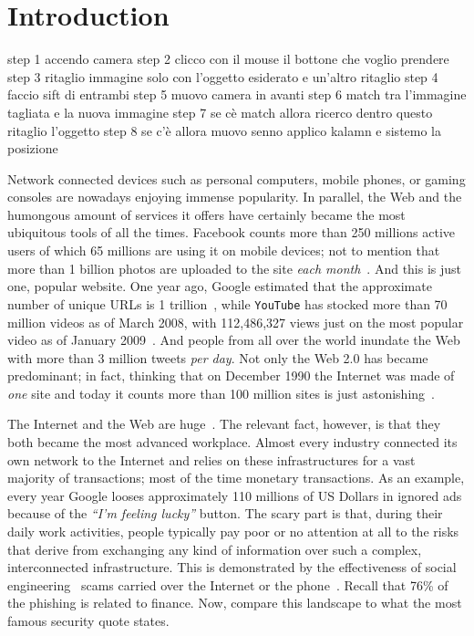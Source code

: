 \chapter{Introduction}
\label{introduction}

step 1 accendo camera
step 2 clicco con il mouse il bottone che voglio prendere
step 3 ritaglio immagine solo con l'oggetto esiderato e un'altro ritaglio
step 4 faccio sift di entrambi
step 5 muovo camera in avanti
step 6 match tra l'immagine tagliata e la nuova immagine
step 7 se cè match allora ricerco dentro questo ritaglio l'oggetto
step 8 se c'è allora muovo senno applico kalamn e sistemo la posizione



















Network connected devices such as personal computers, mobile phones,
or gaming consoles are nowadays enjoying immense popularity. In
parallel, the Web and the humongous amount of services it offers have
certainly became the most ubiquitous tools of all the
times. \textsf{Facebook} counts more than 250 millions active users of
which 65 millions are using it on mobile devices; not to mention that
more than 1 billion photos are uploaded to the site \emph{each
  month}~\citep{facebook-stats}. And this is just one, popular
website. One year ago, \textsf{Google} estimated that the approximate
number of unique \acp{URL} is 1
trillion~\citep{google-is-big}, while \texttt{YouTube} has stocked
more than 70 million videos as of March 2008, with 112,486,327 views
just on the most popular video as of January
2009~\citep{social-media-stats}. And people from all over the world
inundate the Web with more than 3 million tweets \emph{per day}. Not
only the Web 2.0 has became predominant; in fact, thinking that on
December 1990 the Internet was made of \emph{one} site and today it
counts more than 100 million sites is just
astonishing~\citep{internet-timeline}.

The Internet and the Web are huge~\citep{inetworldstats}. The relevant
fact, however, is that they both became the most advanced
workplace. Almost every industry connected its own network to the
Internet and relies on these infrastructures for a vast majority of
transactions; most of the time monetary transactions. As an example,
every year \textsf{Google} looses approximately 110 millions of US
Dollars in ignored ads because of the \emph{``I'm feeling lucky''}
button. The scary part is that, during their daily work activities,
people typically pay poor or no attention at all to the risks that
derive from exchanging any kind of information over such a complex,
interconnected infrastructure. This is demonstrated by the
effectiveness of social engineering~\citep{deception} scams carried
over the Internet or the
phone~\citep{social-engineering-fundamentals}. Recall that 76\% of the
phishing is related to finance. Now, compare this landscape to what
the most famous security quote states.

